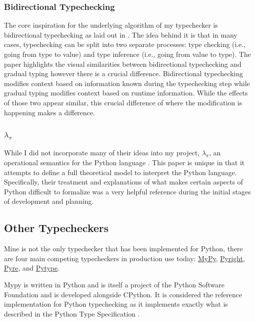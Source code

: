 \documentclass[10pt,twocolumn]{article}
\begin{document}
\subsubsection{Bidirectional Typechecking}
The core inspiration for the underlying algorithm of my typechecker is bidirectional typechecking as laid out in \cite{dunfield_bidirectional_2022}. The idea behind it is that in many cases, typechecking can be split into two separate processes: type checking (i.e., going from type to value) and type inference (i.e., going from value to type). The paper highlights the visual similarities between bidirectional typechecking and gradual typing however there is a crucial difference. Bidirectional typechecking modifies context based on information known during the typechecking step while gradual typing modifies context based on runtime information. While the effects of those two appear similar, this crucial difference of where the modification is happening makes a difference.


\subsubsection{$\lambda_\pi$}
While I did not incorporate many of their ideas into my project, $\lambda_\pi$, an operational semantics for the Python language \cite{politz_python_2013}. This paper is unique in that it attempts to define a full theoretical model to interpret the Python language. Specifically, their treatment and explanations of what makes certain aspects of Python difficult to formalize was a very helpful reference during the initial stages of development and planning.


\subsection{Other Typecheckers}

Mine is not the only typechecker that has been implemented for Python, there are four main competing typecheckers in production use today: \href{https://mypy-lang.org/}{MyPy}, \href{https://github.com/microsoft/pyright}{Pyright}, \href{https://pyre-check.org/}{Pyre}, and \href{https://github.com/google/pytype}{Pytype}.

Mypy is written in Python and is itself a project of the Python Software Foundation and is developed alongside CPython. It is considered the reference implementation for Python typechecking as it implements exactly what is described in the Python Type Specification \cite{pythontypespec}. 
\end{document}
